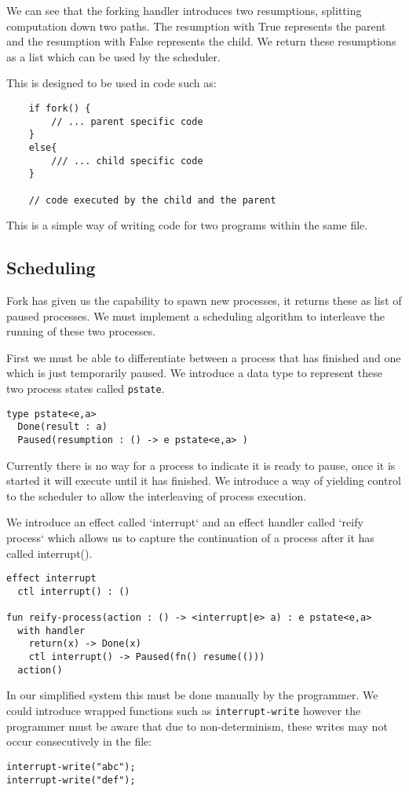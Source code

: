 \documentclass[logo,bsc,singlespacing,parskip]{infthesis}
\begin{document}
We can see that the forking handler introduces two resumptions, splitting computation down two paths. The resumption with True represents the parent and the resumption with False represents the child. We return these resumptions as a list which can be used by the scheduler.

This is designed to be used in code such as:
\begin{lstlisting}
    if fork() {
        // ... parent specific code
    }
    else{
        /// ... child specific code
    }
    
    // code executed by the child and the parent
\end{lstlisting}
This is a simple way of writing code for two programs within the same file.

\subsection*{Scheduling}
Fork has given us the capability to spawn new processes, it returns these as list of paused processes. We must implement a scheduling algorithm to interleave the running of these two processes.

First we must be able to differentiate between a process that has finished and one which is just temporarily paused. We introduce a data type to represent these two process states called \texttt{pstate}. 
\begin{lstlisting}
type pstate<e,a>
  Done(result : a)
  Paused(resumption : () -> e pstate<e,a> )
\end{lstlisting}

Currently there is no way for a process to indicate it is ready to pause, once it is started it will execute until it has finished. We introduce a way of yielding control to the scheduler to allow the interleaving of process execution.

We introduce an effect called `interrupt` and an effect handler called `reify process` which allows us to capture the continuation of a process after it has called interrupt().
\begin{lstlisting}
effect interrupt
  ctl interrupt() : ()

fun reify-process(action : () -> <interrupt|e> a) : e pstate<e,a> 
  with handler  
    return(x) -> Done(x)
    ctl interrupt() -> Paused(fn() resume(()))
  action()
\end{lstlisting}
In our simplified system this must be done manually by the programmer. We could introduce wrapped functions such as \texttt{interrupt-write} however the programmer must be aware that due to non-determinism, these writes may not occur consecutively in the file:
\begin{lstlisting}
interrupt-write("abc");
interrupt-write("def");
\end{lstlisting}
\end{document}
